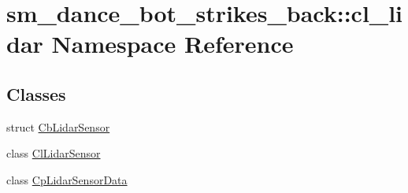 \hypertarget{namespacesm__dance__bot__strikes__back_1_1cl__lidar}{}\section{sm\+\_\+dance\+\_\+bot\+\_\+strikes\+\_\+back\+:\+:cl\+\_\+lidar Namespace Reference}
\label{namespacesm__dance__bot__strikes__back_1_1cl__lidar}
\subsection*{Classes}
\begin{DoxyCompactItemize}
\item 
struct \hyperlink{structsm__dance__bot__strikes__back_1_1cl__lidar_1_1CbLidarSensor}{Cb\+Lidar\+Sensor}
\item 
class \hyperlink{classsm__dance__bot__strikes__back_1_1cl__lidar_1_1ClLidarSensor}{Cl\+Lidar\+Sensor}
\item 
class \hyperlink{classsm__dance__bot__strikes__back_1_1cl__lidar_1_1CpLidarSensorData}{Cp\+Lidar\+Sensor\+Data}
\end{DoxyCompactItemize}

